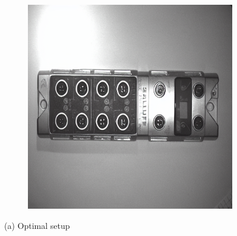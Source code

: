 \documentclass[12pt,DIV14,BCOR12mm,a4paper,footinclude=false,headinclude,parskip=half-,twoside,openright,cleardoublepage=empty,toc=index,bibliography=totoc,listof=totoc]{scrreprt}
\numberwithin{equation}{chapter}
\begin{document}
\begin{figure}
\begin{subfigure}[t]{0.45\textwidth}
        \includegraphics[width=\textwidth]{../media/diff_bni_optimal_fake.png}
    \end{subfigure}
    \caption*{(a) Optimal setup}

    \vspace{0.3cm} %


\end{figure}
\end{document}
